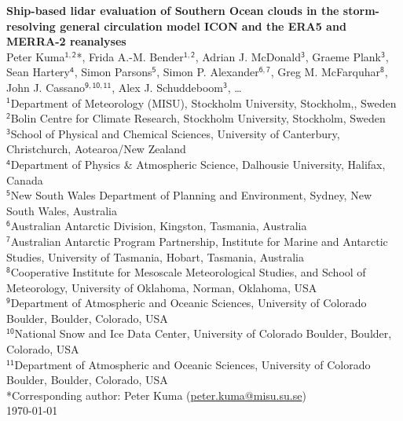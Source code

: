 \documentclass[12pt,a4paper]{article}
\begin{document}
\fontsize{13pt}{15pt}\selectfont

\begin{center} \Large \sffamily\textbf{Ship-based lidar evaluation of Southern Ocean clouds in the storm-resolving general circulation model ICON and the ERA5 and MERRA-2 reanalyses}\\[0.4cm]
\large Peter Kuma$^\mathsf{1,2}$*, Frida A.-M. Bender$^\mathsf{1,2}$, Adrian J. McDonald$^\mathsf{3}$, Graeme Plank$^\mathsf{3}$, Sean Hartery$^\mathsf{4}$, Simon Parsons$^\mathsf{5}$, Simon P. Alexander$^\mathsf{6,7}$, Greg M. McFarquhar$^\mathsf{8}$, John J. Cassano$^\mathsf{9,10,11}$, Alex J. Schuddeboom$^\mathsf{3}$, \ldots\\[0.4cm]
\small
$^\mathsf{1}$Department of Meteorology (MISU), Stockholm University, Stockholm,, Sweden\\
$^\mathsf{2}$Bolin Centre for Climate Research, Stockholm University, Stockholm, Sweden\\
$^\mathsf{3}$School of Physical and Chemical Sciences, University of Canterbury, Christchurch, Aotearoa/New Zealand\\
$^\mathsf{4}$Department of Physics \& Atmospheric Science, Dalhousie University, Halifax, Canada\\
$^\mathsf{5}$New South Wales Department of Planning and Environment, Sydney, New South Wales, Australia\\
$^\mathsf{6}$Australian Antarctic Division, Kingston, Tasmania, Australia\\
$^\mathsf{7}$Australian Antarctic Program Partnership, Institute for Marine and Antarctic Studies, University of Tasmania, Hobart, Tasmania, Australia\\
$^\mathsf{8}$Cooperative Institute for Mesoscale Meteorological Studies, and School of Meteorology, University of Oklahoma, Norman, Oklahoma, USA\\
$^\mathsf{9}$Department of Atmospheric and Oceanic Sciences, University of Colorado Boulder, Boulder, Colorado, USA\\
$^\mathsf{10}$National Snow and Ice Data Center, University of Colorado Boulder, Boulder, Colorado, USA\\
$^\mathsf{11}$Department of Atmospheric and Oceanic Sciences, University of Colorado Boulder, Boulder, Colorado, USA\\[0.2cm]
*Corresponding author: Peter Kuma (\href{mailto:peter.kuma@misu.su.se}{peter.kuma@misu.su.se})\\[0.4cm]
\large \today\\[0.4cm]

\end{center}
\end{document}
